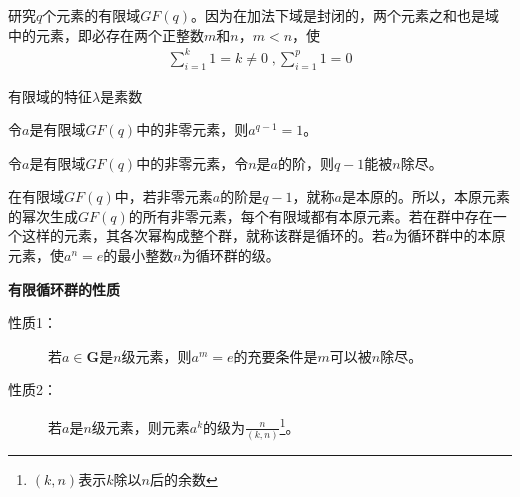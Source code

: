 研究$q$个元素的有限域$GF(q)$。因为在加法下域是封闭的，两个元素之和也是域中的元素，即必存在两个正整数$m$和$n$，$m<n$，使
\begin{eqnarray}
  \sum_{i=1}^k 1=k\neq 0 \;, \sum_{i=1}^p 1 =0
  \label{2.7}
\end{eqnarray}
\begin{ioatheorem}
  有限域的特征$\lambda$是素数
  \label{theorem:2.4}
\end{ioatheorem}
\begin{ioatheorem}
  令$a$是有限域$GF(q)$中的非零元素，则$a^{q-1}=1$。
  \label{theorem:2.5}
\end{ioatheorem}
\begin{ioatheorem}
  令$a$是有限域$GF(q)$中的非零元素，令$n$是$a$的阶，则$q-1$能被$n$除尽。
  \label{theorem:2.6}
\end{ioatheorem}
在有限域$GF(q)$中，若非零元素$a$的阶是$q-1$，就称$a$是本原的。所以，本原元素的幂次生成$GF(q)$的所有非零元素，每个有限域都有本原元素。若在群中存在一个这样的元素，其各次幂构成整个群，就称该群是循环的。若$a$为循环群中的本原元素，使$a^n=e$的最小整数$n$为循环群的级。

\textbf{有限循环群的性质}
\begin{description}
  \item[性质1：]若$a\in
    \mathbf{G}$是$n$级元素，则$a^m=e$的充要条件是$m$可以被$n$除尽。
  \item[性质2：]若$a$是$n$级元素，则元素$a^k$的级为$\frac{n}{(k,n)}$\footnote{$(k,n)$表示$k$除以$n$后的余数}。
\end{description}
